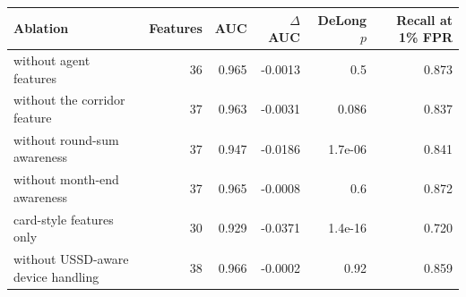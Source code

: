 \begin{tabular}{lrrrrr}
\toprule
Ablation & Features & AUC & $\Delta$AUC & DeLong $p$ & Recall at 1\% FPR \\
\midrule
without agent features & 36 & 0.965 & -0.0013 & 0.5 & 0.873 \\
without the corridor feature & 37 & 0.963 & -0.0031 & 0.086 & 0.837 \\
without round-sum awareness & 37 & 0.947 & -0.0186 & 1.7e-06 & 0.841 \\
without month-end awareness & 37 & 0.965 & -0.0008 & 0.6 & 0.872 \\
card-style features only & 30 & 0.929 & -0.0371 & 1.4e-16 & 0.720 \\
without USSD-aware device handling & 38 & 0.966 & -0.0002 & 0.92 & 0.859 \\
\bottomrule
\end{tabular}

